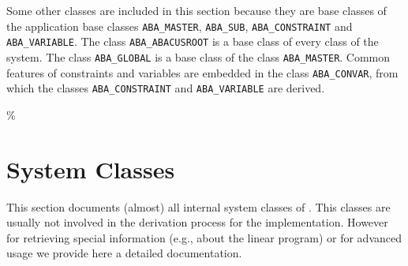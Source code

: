 Some other classes are included in this section because they are base
classes of the application base classes {\tt ABA\_MASTER}, {\tt ABA\_SUB},
{\tt ABA\_CONSTRAINT} and {\tt ABA\_VARIABLE}. The class {\tt ABA\_ABACUSROOT} is a
base class of every class of the system. The class {\tt ABA\_GLOBAL} is a 
base class of the class {\tt ABA\_MASTER}. Common features of constraints
and variables are embedded in the class {\tt ABA\_CONVAR}, from which the
classes {\tt ABA\_CONSTRAINT} and {\tt ABA\_VARIABLE} are derived.



















\%%

\section{System Classes}

This section documents (almost) all internal system classes of
\ABACUS. This classes are usually not involved in the derivation
process for the implementation. However for retrieving special
information (e.g., about the linear program) or for advanced usage
we provide here a detailed documentation.

















